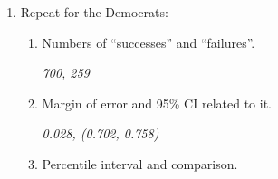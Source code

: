 \begin{enumerate}
\begin{enumerate}
\begin{enumerate}
\begin{key}
  {\em 199 ``successes'', 538 ``Failures'', $\phat = $0.27}
\end{key}
      \item Click   and run several 1000
        samples. What is the SE?
\begin{students}
\vspace{.8cm}
\end{students}

\begin{key}
  {\em 0.016}
\end{key}
      \item Find the ``margin of error'' for a 95\% Confidence
        interval and create the interval.

\begin{students}
\vspace{.8cm}
\end{students}

\begin{key}
  {\em ME = 0.032, 95\% CI: 0.27$\pm 0.032 = (0.38, 0.302)$}
\end{key}
  \item Are the endpoints close to those we get from the web app?
\begin{students}
\vspace{.8cm}
\end{students}

\begin{key}
  {\em almost identical: ( 0.237 , 0.303 )}
\end{key}
      \end{enumerate}
    \item Repeat for the Democrats:
      \begin{enumerate}
      \item Numbers of ``successes'' and ``failures''.
\begin{students}
\vspace{.8cm}
\end{students}

\begin{key}
  {\em 700, 259 }
\end{key}
      \item Margin of error and 95\% CI related to it.
\begin{students}
\vspace{.8cm}
\end{students}

\begin{key}
  {\em 0.028, (0.702, 0.758)}
\end{key}
      \item Percentile interval and comparison.
\begin{students}
\vspace{.8cm}
\end{students}


\end{enumerate}
\end{enumerate}
\end{enumerate}
